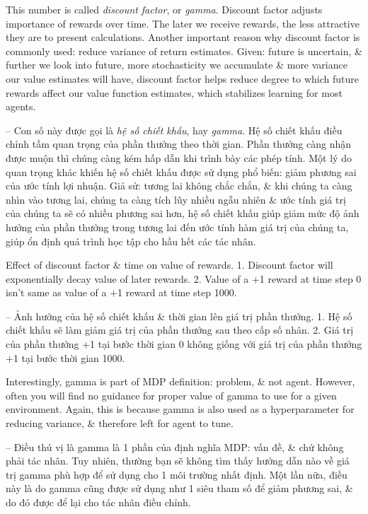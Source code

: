 \documentclass{article}
\begin{document}
\begin{itemize}
\begin{itemize}
        This number is called {\it discount factor}, or {\it gamma}. Discount factor adjusts importance of rewards over time. The later we receive rewards, the less attractive they are to present calculations. Another important reason why discount factor is commonly used: reduce variance of return estimates. Given: future is uncertain, \& further we look into future, more stochasticity we accumulate \& more variance our value estimates will have, discount factor helps reduce degree to which future rewards affect our value function estimates, which stabilizes learning for most agents.

        -- Con số này được gọi là {\it hệ số chiết khấu}, hay {\it gamma}. Hệ số chiết khấu điều chỉnh tầm quan trọng của phần thưởng theo thời gian. Phần thưởng càng nhận được muộn thì chúng càng kém hấp dẫn khi trình bày các phép tính. Một lý do quan trọng khác khiến hệ số chiết khấu được sử dụng phổ biến: giảm phương sai của ước tính lợi nhuận. Giả sử: tương lai không chắc chắn, \& khi chúng ta càng nhìn vào tương lai, chúng ta càng tích lũy nhiều ngẫu nhiên \& ước tính giá trị của chúng ta sẽ có nhiều phương sai hơn, hệ số chiết khấu giúp giảm mức độ ảnh hưởng của phần thưởng trong tương lai đến ước tính hàm giá trị của chúng ta, giúp ổn định quá trình học tập cho hầu hết các tác nhân.

        {\sf Effect of discount factor \& time on value of rewards.} 1. Discount factor will exponentially decay value of later rewards. 2. Value of a +1 reward at time step 0 isn't same as value of a +1 reward at time step 1000.

        -- {\sf Ảnh hưởng của hệ số chiết khấu \& thời gian lên giá trị phần thưởng.} 1. Hệ số chiết khấu sẽ làm giảm giá trị của phần thưởng sau theo cấp số nhân. 2. Giá trị của phần thưởng +1 tại bước thời gian 0 không giống với giá trị của phần thưởng +1 tại bước thời gian 1000.

        Interestingly, gamma is part of MDP definition: problem, \& not agent. However, often you will find no guidance for proper value of gamma to use for a given environment. Again, this is because gamma is also used as a hyperparameter for reducing variance, \& therefore left for agent to tune.

        -- Điều thú vị là gamma là 1 phần của định nghĩa MDP: vấn đề, \& chứ không phải tác nhân. Tuy nhiên, thường bạn sẽ không tìm thấy hướng dẫn nào về giá trị gamma phù hợp để sử dụng cho 1 môi trường nhất định. Một lần nữa, điều này là do gamma cũng được sử dụng như 1 siêu tham số để giảm phương sai, \& do đó được để lại cho tác nhân điều chỉnh.


\end{itemize}
\end{itemize}
\end{document}
